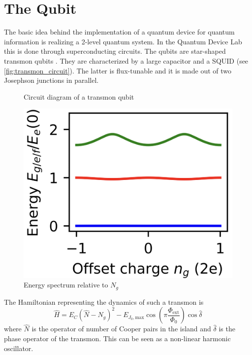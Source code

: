 \section{The Qubit}
\label{sec:qubit}

The basic idea behind the implementation of a quantum device for quantum information is realizing a 2-level quantum system.
In the Quantum Device Lab this is done through superconducting circuits.
The qubits are star-shaped transmon qubits \cite{transmon_qubits}.
They are characterized by a large capacitor and a SQUID (see \cref{fig:transmon_circuit}).
The latter is flux-tunable and it is made out of two Josephson junctions in parallel.
\begin{figure}[htbp]
    \begin{minipage}[b]{0.5\linewidth}
      \centering
      
      \captionsetup{skip=-20pt}
      \caption{Circuit diagram of a transmon qubit}
      \label{fig:transmon_circuit}
    \end{minipage}
    \hfill
    \begin{minipage}[b]{0.45\linewidth}
      \centering
      \includegraphics[width = 0.5 \textwidth]{Images/Chap1/Qubit_energy.png}
      \caption{Energy spectrum relative to $N_g$}
      \label{fig:qubit_energy}
    \end{minipage}
  \end{figure}
  

The Hamiltonian representing the dynamics of such a transmon is 
\begin{equation}
    \hat{H} = E_C (\hat{N} - N_g)^2 - E_{J_0, \text{max}} \cos(\pi\frac{\Phi_{\text{ext}}}{\Phi_0})\cos\hat{\delta}
\end{equation}
where $\hat{N}$ is the operator of number of Cooper pairs in the island and $\hat{\delta}$ is the phase operator of the transmon.
This can be seen as a non-linear harmonic oscillator.

